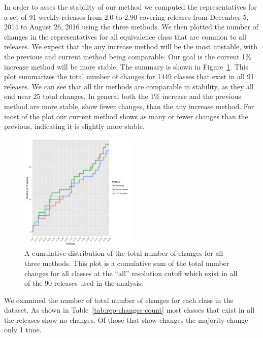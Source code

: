 In order to asses the stability of our method we computed the representatives
for a set of 91 weekly releases from 2.0 to 2.90 covering releases from December
5, 2014 to August 26, 2016 using the three methods. We then plotted the number
of changes in the representatives for all equivalence class that are common to
all releases. We expect that the any increase method will be the most unstable,
with the previous and current method being comparable. Our goal is the current
1\% increase method will be more stable. The summary is shown in
Figure~\ref{fig:rep-changes}. This plot summarizes the total number of changes
for 1449 classes that exist in all 91 releases. We can see that all thr%
methods are comparable in stability, as they all end near 25 total changes. In
general both the 1\% increase and the previous method are more stable, show fewer
changes, than the any increase method. For most of the plot our current method
shows as many or fewer changes than the previous, indicating it is slightly more
stable.

\begin{figure}
  \includegraphics[width=0.5\textwidth]{chapter-4/figs/rep-count-changes}
  \caption{A cumulative distribution of the total number of changes for all
    three methods. This plot is a cumulative sum of the total number changes for
    all classes at the ``all'' resolution cutoff which exist in all of the 90
  releases used in the analysis.}
  \label{fig:rep-changes}
\end{figure}

We examined the number of total number of changes for each class in the dataset.
As shown in Table~\ref{tab:rep-changes-count} most classes that exist in all the
releases show no changes. Of those that show changes the majority change only 1
time.

